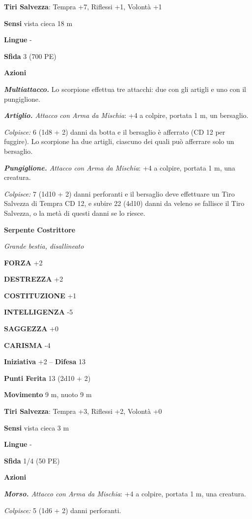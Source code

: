 \begin{multicols}{2}
\textbf{Tiri Salvezza}: Tempra +7, Riflessi +1, Volontà +1

\textbf{Sensi} vista cieca 18 m

\textbf{Lingue} -

\textbf{Sfida} 3 (700 PE)

\textbf{Azioni}

\emph{\textbf{Multiattacco.}} Lo scorpione effettua tre attacchi: due con gli artigli e uno con il pungiglione.

\emph{\textbf{Artiglio.} Attacco con Arma da Mischia}: +4 a colpire, portata 1 m, un bersaglio.

\emph{Colpisce:} 6 (1d8 + 2) danni da botta e il bersaglio è afferrato (CD 12 per fuggire). Lo scorpione ha due artigli, ciascuno dei quali può afferrare solo un bersaglio.

\emph{\textbf{Pungiglione.} Attacco con Arma da Mischia}: +4 a colpire, portata 1 m, una creatura.

\emph{Colpisce:} 7 (1d10 + 2) danni perforanti e il bersaglio deve effettuare un Tiro Salvezza di Tempra CD 12, e subire 22 (4d10) danni da veleno se fallisce il Tiro Salvezza, o la metà di questi danni se lo riesce.

\medskip\textbf{Serpente Costrittore}

\emph{Grande bestia, disallineato}

\textbf{FORZA} +2

\textbf{DESTREZZA} +2

\textbf{COSTITUZIONE} +1

\textbf{INTELLIGENZA} -5

\textbf{SAGGEZZA} +0

\textbf{CARISMA} -4

\textbf{Iniziativa} +2 -- \textbf{Difesa} 13

\textbf{Punti Ferita} 13 (2d10 + 2)

\textbf{Movimento} 9 m, nuoto 9 m

\textbf{Tiri Salvezza}: Tempra +3, Riflessi +2, Volontà +0

\textbf{Sensi} vista cieca 3 m

\textbf{Lingue} -

\textbf{Sfida} 1/4 (50 PE)

\textbf{Azioni}

\emph{\textbf{Morso.} Attacco con Arma da Mischia}: +4 a colpire, portata 1 m, una creatura.

\emph{Colpisce:} 5 (1d6 + 2) danni perforanti.


\end{multicols}
